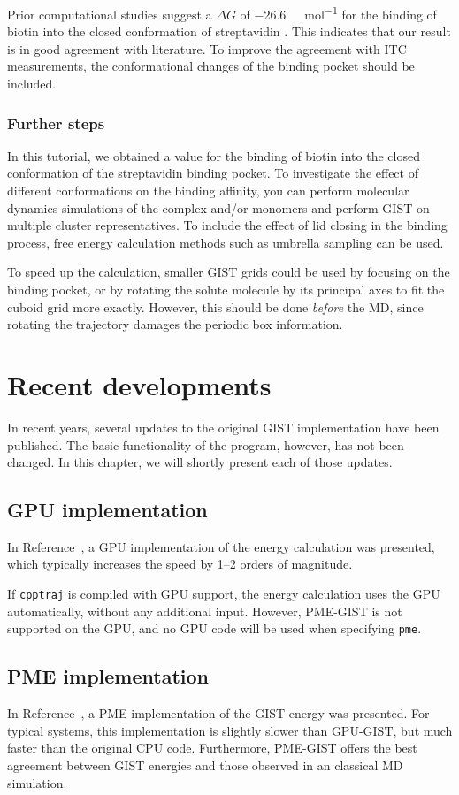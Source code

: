 \documentclass[9pt,tutorial]{livecoms}
\newcommand{\software}{\texttt}
\newcommand\inlinecode{\texttt}
\begin{document}
Prior computational studies suggest a $\Delta G$ of \SI{-26.6}{\kilo\calorie\per\mole} for the binding of biotin into the closed conformation of streptavidin \cite{Bansal2018-biotin}.
This indicates that our result is in good agreement with literature.
To improve the agreement with ITC measurements, the conformational changes of the binding pocket should be included.

\subsubsection{Further steps}
In this tutorial, we obtained a value for the binding of biotin into the closed conformation of the streptavidin binding pocket.
To investigate the effect of different conformations on the binding affinity, you can perform molecular dynamics simulations of the complex and/or monomers and perform GIST on multiple cluster representatives.
To include the effect of lid closing in the binding process, free energy calculation methods such as umbrella sampling can be used.

To speed up the calculation, smaller GIST grids could be used by focusing on the binding pocket, or by rotating the solute molecule by its principal axes to fit the cuboid grid more exactly.
However, this should be done \emph{before} the MD, since rotating the trajectory damages the periodic box information.

\section{Recent developments}
In recent years, several updates to the original GIST implementation have been published.
The basic functionality of the program, however, has not been changed.
In this chapter, we will shortly present each of those updates.
\subsection{GPU implementation}
In Reference~\cite{Kraml2020}, a GPU implementation of the energy calculation was presented, which typically increases the speed by 1--2 orders of magnitude.

If \software{cpptraj} is compiled with GPU support, the energy calculation uses the GPU automatically, without any additional input.
However, PME-GIST is not supported on the GPU, and no GPU code will be used when specifying \inlinecode{pme}.

\subsection{PME implementation}
In Reference~\cite{Chen2021}, a PME implementation of the GIST energy was presented.
For typical systems, this implementation is slightly slower than GPU-GIST, but much faster than the original CPU code.
Furthermore, PME-GIST offers the best agreement between GIST energies and those observed in an classical MD simulation.
\end{document}
